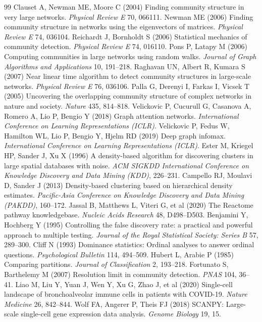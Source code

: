 \documentclass[twocolumn,10pt,a4paper]{article}
\begin{document}
\begin{thebibliography}{99}
 Clauset A, Newman ME, Moore C (2004) Finding community structure in very large networks. \textit{Physical Review E} 70, 066111.
 Newman ME (2006) Finding community structure in networks using the eigenvectors of matrices. \textit{Physical Review E} 74, 036104.
 Reichardt J, Bornholdt S (2006) Statistical mechanics of community detection. \textit{Physical Review E} 74, 016110.
 Pons P, Latapy M (2006) Computing communities in large networks using random walks. \textit{Journal of Graph Algorithms and Applications} 10, 191--218.
 Raghavan UN, Albert R, Kumara S (2007) Near linear time algorithm to detect community structures in large-scale networks. \textit{Physical Review E} 76, 036106.
 Palla G, Derenyi I, Farkas I, Vicsek T (2005) Uncovering the overlapping community structure of complex networks in nature and society. \textit{Nature} 435, 814--818.
 Velickovic P, Cucurull G, Casanova A, Romero A, Lio P, Bengio Y (2018) Graph attention networks. \textit{International Conference on Learning Representations (ICLR)}.
 Velickovic P, Fedus W, Hamilton WL, Lio P, Bengio Y, Hjelm RD (2019) Deep graph infomax. \textit{International Conference on Learning Representations (ICLR)}.
 Ester M, Kriegel HP, Sander J, Xu X (1996) A density-based algorithm for discovering clusters in large spatial databases with noise. \textit{ACM SIGKDD International Conference on Knowledge Discovery and Data Mining (KDD)}, 226--231.
 Campello RJ, Moulavi D, Sander J (2013) Density-based clustering based on hierarchical density estimates. \textit{Pacific-Asia Conference on Knowledge Discovery and Data Mining (PAKDD)}, 160--172.
 Jassal B, Matthews L, Viteri G, et al (2020) The Reactome pathway knowledgebase. \textit{Nucleic Acids Research} 48, D498--D503.
 Benjamini Y, Hochberg Y (1995) Controlling the false discovery rate: a practical and powerful approach to multiple testing. \textit{Journal of the Royal Statistical Society: Series B} 57, 289--300.
 Cliff N (1993) Dominance statistics: Ordinal analyses to answer ordinal questions. \textit{Psychological Bulletin} 114, 494--509.
 Hubert L, Arabie P (1985) Comparing partitions. \textit{Journal of Classification} 2, 193--218.
 Fortunato S, Barthelemy M (2007) Resolution limit in community detection. \textit{PNAS} 104, 36--41.
 Liao M, Liu Y, Yuan J, Wen Y, Xu G, Zhao J, et al (2020) Single-cell landscape of bronchoalveolar immune cells in patients with COVID-19. \textit{Nature Medicine} 26, 842--844.
 Wolf FA, Angerer P, Theis FJ (2018) SCANPY: Large-scale single-cell gene expression data analysis. \textit{Genome Biology} 19, 15.
\end{thebibliography}
\end{document}
